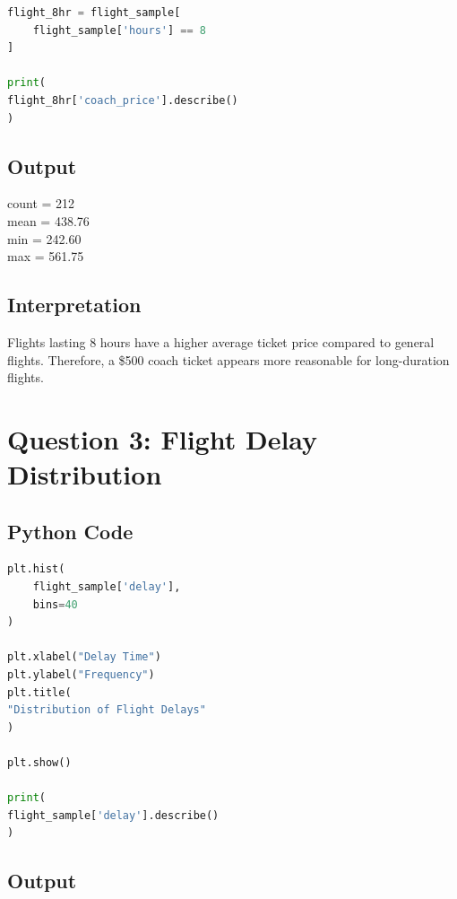\documentclass[12pt,a4paper]{article}
\begin{document}
\begin{lstlisting}[language=Python]
flight_8hr = flight_sample[
    flight_sample['hours'] == 8
]

print(
flight_8hr['coach_price'].describe()
)
\end{lstlisting}

\subsection{Output}

\begin{tcolorbox}[colback=lightblue]
count = 212 \\
mean = 438.76 \\
min = 242.60 \\
max = 561.75
\end{tcolorbox}

\subsection{Interpretation}

Flights lasting 8 hours have a higher average ticket price compared to general flights. Therefore, a \$500 coach ticket appears more reasonable for long-duration flights.

\section{Question 3: Flight Delay Distribution}

\subsection{Python Code}

\begin{lstlisting}[language=Python]
plt.hist(
    flight_sample['delay'],
    bins=40
)

plt.xlabel("Delay Time")
plt.ylabel("Frequency")
plt.title(
"Distribution of Flight Delays"
)

plt.show()

print(
flight_sample['delay'].describe()
)
\end{lstlisting}

\subsection{Output}
\end{document}

